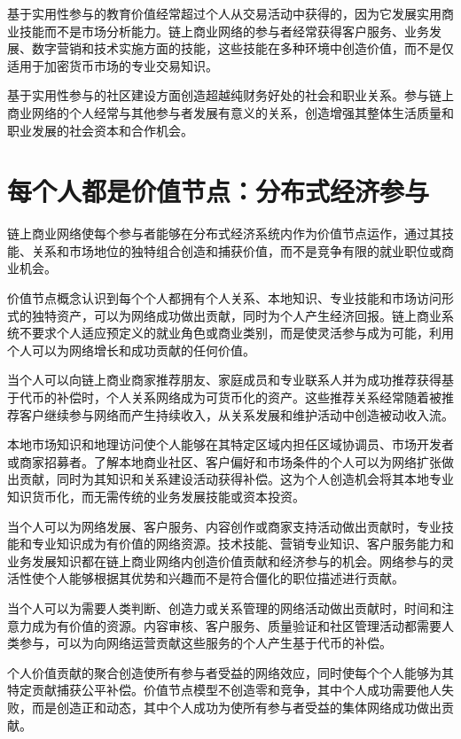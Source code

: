 \documentclass[
  Letterpaper,
]{scrbook}
\begin{document}
基于实用性参与的教育价值经常超过个人从交易活动中获得的，因为它发展实用商业技能而不是市场分析能力。链上商业网络的参与者经常获得客户服务、业务发展、数字营销和技术实施方面的技能，这些技能在多种环境中创造价值，而不是仅适用于加密货币市场的专业交易知识。

基于实用性参与的社区建设方面创造超越纯财务好处的社会和职业关系。参与链上商业网络的个人经常与其他参与者发展有意义的关系，创造增强其整体生活质量和职业发展的社会资本和合作机会。

\section{每个人都是价值节点：分布式经济参与}\label{ux6bcfux4e2aux4ebaux90fdux662fux4ef7ux503cux8282ux70b9ux5206ux5e03ux5f0fux7ecfux6d4eux53c2ux4e0e}

链上商业网络使每个参与者能够在分布式经济系统内作为价值节点运作，通过其技能、关系和市场地位的独特组合创造和捕获价值，而不是竞争有限的就业职位或商业机会。

价值节点概念认识到每个个人都拥有个人关系、本地知识、专业技能和市场访问形式的独特资产，可以为网络成功做出贡献，同时为个人产生经济回报。链上商业系统不要求个人适应预定义的就业角色或商业类别，而是使灵活参与成为可能，利用个人可以为网络增长和成功贡献的任何价值。

当个人可以向链上商业商家推荐朋友、家庭成员和专业联系人并为成功推荐获得基于代币的补偿时，个人关系网络成为可货币化的资产。这些推荐关系经常随着被推荐客户继续参与网络而产生持续收入，从关系发展和维护活动中创造被动收入流。

本地市场知识和地理访问使个人能够在其特定区域内担任区域协调员、市场开发者或商家招募者。了解本地商业社区、客户偏好和市场条件的个人可以为网络扩张做出贡献，同时为其知识和关系建设活动获得补偿。这为个人创造机会将其本地专业知识货币化，而无需传统的业务发展技能或资本投资。

当个人可以为网络发展、客户服务、内容创作或商家支持活动做出贡献时，专业技能和专业知识成为有价值的网络资源。技术技能、营销专业知识、客户服务能力和业务发展知识都在链上商业网络内创造价值贡献和经济参与的机会。网络参与的灵活性使个人能够根据其优势和兴趣而不是符合僵化的职位描述进行贡献。

当个人可以为需要人类判断、创造力或关系管理的网络活动做出贡献时，时间和注意力成为有价值的资源。内容审核、客户服务、质量验证和社区管理活动都需要人类参与，可以为向网络运营贡献这些服务的个人产生基于代币的补偿。

个人价值贡献的聚合创造使所有参与者受益的网络效应，同时使每个个人能够为其特定贡献捕获公平补偿。价值节点模型不创造零和竞争，其中个人成功需要他人失败，而是创造正和动态，其中个人成功为使所有参与者受益的集体网络成功做出贡献。
\end{document}
